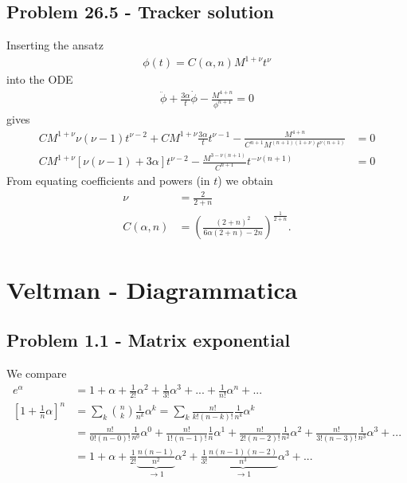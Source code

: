 \documentclass[../main.tex]{subfiles}
\begin{document}
\subsection{Problem 26.5 - Tracker solution}
Inserting the ansatz
\begin{align}
    \phi(t)=C(\alpha,n)M^{1+\nu}t^\nu
\end{align}
into the ODE
\begin{align}
    \ddot\phi+\frac{3\alpha}{t}\dot\phi-\frac{M^{4+n}}{\phi^{n+1}}=0
\end{align}
gives
\begin{align}
    CM^{1+\nu}\nu(\nu-1)t^{\nu-2}+CM^{1+\nu}\frac{3\alpha}{t}t^{\nu-1}-\frac{M^{4+n}}{C^{n+1}M^{(n+1)(1+\nu)}t^{\nu(n+1)}}&=0\\
    CM^{1+\nu}\left[\nu(\nu-1)+3\alpha\right]t^{\nu-2}-\frac{M^{3-\nu(n+1)}}{C^{n+1}}t^{-\nu(n+1)}&=0
\end{align}
From equating coefficients and powers (in $t$) we obtain
\begin{align}
    \nu&=\frac{2}{2+n}\\
    C(\alpha,n)&=\left(\frac{(2+n)^2}{6\alpha(2+n)-2n}\right)^\frac{1}{2+n}.
\end{align}

\newpage
\section{{\sc Veltman} - Diagrammatica}
\subsection{Problem 1.1 - Matrix exponential}
We compare
\begin{align}
e^\alpha&=1+\alpha+\frac{1}{2!}\alpha^2+\frac{1}{3!}\alpha^3+...+\frac{1}{n!}\alpha^n+...\\
\left[1+\frac{1}{n}\alpha\right]^n&=\sum_k \binom{n}{k}\frac{1}{n^k}\alpha^k=\sum_k \frac{n!}{k!(n-k)!}\frac{1}{n^k}\alpha^k\\
&=\frac{n!}{0!(n-0)!}\frac{1}{n^0}\alpha^0+\frac{n!}{1!(n-1)!}\frac{1}{n}\alpha^1+\frac{n!}{2!(n-2)!}\frac{1}{n^2}\alpha^2+\frac{n!}{3!(n-3)!}\frac{1}{n^3}\alpha^3+...\\
&=1+\alpha+\frac{1}{2!}\underbrace{\frac{n(n-1)}{n^2}}_{\rightarrow1}\alpha^2+\frac{1}{3!}\underbrace{\frac{n(n-1)(n-2)}{n^3}}_{\rightarrow1}\alpha^3+...
\end{align}
\end{document}
